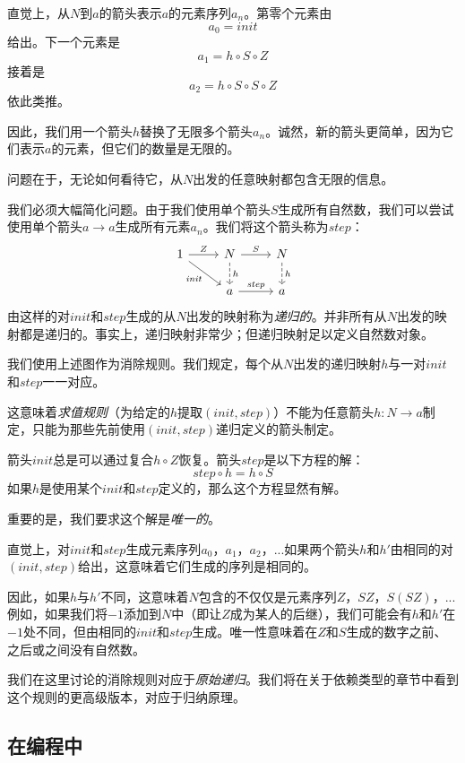 \documentclass[DaoFP]{subfiles}
\begin{document}
直觉上，从$N$到$a$的箭头表示$a$的元素序列$a_n$。第零个元素由
\[a_0=\mathit{init}\]
给出。下一个元素是
\[a_1 = h \circ S \circ Z \]
接着是
\[a_2 = h \circ S \circ S \circ Z \]
依此类推。

因此，我们用一个箭头$h$替换了无限多个箭头$a_n$。诚然，新的箭头更简单，因为它们表示$a$的元素，但它们的数量是无限的。

问题在于，无论如何看待它，从$N$出发的任意映射都包含无限的信息。

我们必须大幅简化问题。由于我们使用单个箭头$S$生成所有自然数，我们可以尝试使用单个箭头$a \to a$生成所有元素$a_n$。我们将这个箭头称为$\mathit{step}$：
\[
 \begin{tikzcd}
 1
 \arrow[r, "Z"]
 \arrow[rd, "\mathit{init}"']
 &N
  \arrow[r, "S"]
\arrow[d, dashed, "h"]
&N
\arrow[d, dashed, "h"]
\\
& a
\arrow[r, "\mathit{step}"]
& a
  \end{tikzcd}
\]
由这样的对$\mathit{init}$和$\mathit{step}$生成的从$N$出发的映射称为\emph{递归的}。并非所有从$N$出发的映射都是递归的。事实上，递归映射非常少；但递归映射足以定义自然数对象。

我们使用上述图作为消除规则。我们规定，每个从$N$出发的递归映射$h$与一对$\mathit{init}$和$\mathit{step}$一一对应。

这意味着\emph{求值规则}（为给定的$h$提取$(\mathit{init}, \mathit{step})$）不能为任意箭头$h \colon N \to a$制定，只能为那些先前使用$(\mathit{init}, \mathit{step})$递归定义的箭头制定。

箭头$\mathit{init}$总是可以通过复合$h \circ Z$恢复。箭头$\mathit{step}$是以下方程的解：
\[ \mathit{step} \circ h = h \circ S \]
如果$h$是使用某个$\mathit{init}$和$\mathit{step}$定义的，那么这个方程显然有解。

重要的是，我们要求这个解是\emph{唯一的}。

直觉上，对$\mathit{init}$和$\mathit{step}$生成元素序列$a_0$，$a_1$，$a_2$，...如果两个箭头$h$和$h'$由相同的对$(\mathit{init}, \mathit{step})$给出，这意味着它们生成的序列是相同的。

因此，如果$h$与$h'$不同，这意味着$N$包含的不仅仅是元素序列$Z$，$S Z$，$S(S Z)$，...例如，如果我们将$-1$添加到$N$中（即让$Z$成为某人的后继），我们可能会有$h$和$h'$在$-1$处不同，但由相同的$\mathit{init}$和$\mathit{step}$生成。唯一性意味着在$Z$和$S$生成的数字之前、之后或之间没有自然数。

我们在这里讨论的消除规则对应于\emph{原始递归}。我们将在关于依赖类型的章节中看到这个规则的更高级版本，对应于归纳原理。

\subsection{在编程中}
\end{document}
